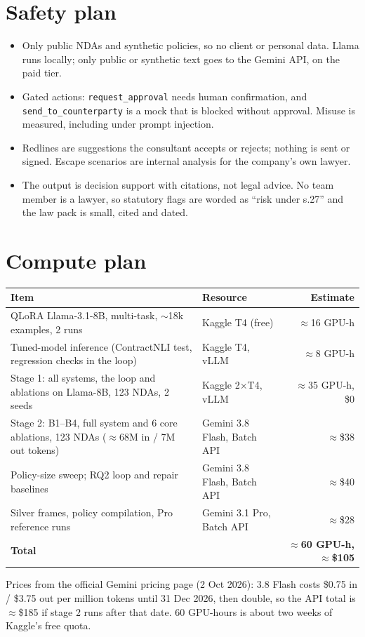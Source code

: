 \documentclass[11pt,a4paper]{article}
\begin{document}
\section{Safety plan}
\begin{itemize}
\item Only public NDAs and synthetic policies, so no client or personal data. Llama runs locally; only public or synthetic text goes to the Gemini API, on the paid tier.
\item Gated actions: \texttt{request\_approval} needs human confirmation, and \texttt{send\_to\_counterparty} is a mock that is blocked without approval. Misuse is measured, including under prompt injection.
\item Redlines are suggestions the consultant accepts or rejects; nothing is sent or signed. Escape scenarios are internal analysis for the company's own lawyer.
\item The output is decision support with citations, not legal advice. No team member is a lawyer, so statutory flags are worded as ``risk under s.27'' and the law pack is small, cited and dated.
\end{itemize}

\section{Compute plan}
\begin{table}[H]\small
\begin{tabularx}{\textwidth}{@{}LXr@{}}
\toprule
\textbf{Item} & \textbf{Resource} & \textbf{Estimate} \\
\midrule
QLoRA Llama-3.1-8B, multi-task, $\sim$18k examples, 2 runs & Kaggle T4 (free) & $\approx$16 GPU-h \\
Tuned-model inference (ContractNLI test, regression checks in the loop) & Kaggle T4, vLLM & $\approx$8 GPU-h \\
Stage 1: all systems, the loop and ablations on Llama-8B, 123 NDAs, 2 seeds & Kaggle 2$\times$T4, vLLM & $\approx$35 GPU-h, \$0 \\
Stage 2: B1--B4, full system and 6 core ablations, 123 NDAs ($\approx$68M in / 7M out tokens) & Gemini 3.8 Flash, Batch API & $\approx$\$38 \\
Policy-size sweep; RQ2 loop and repair baselines & Gemini 3.8 Flash, Batch API & $\approx$\$40 \\
Silver frames, policy compilation, Pro reference runs & Gemini 3.1 Pro, Batch API & $\approx$\$28 \\
\midrule
\textbf{Total} & & \textbf{$\approx$60 GPU-h, $\approx$\$105} \\
\bottomrule
\end{tabularx}
\end{table}
\vspace{-4pt}
{\small Prices from the official Gemini pricing page (2 Oct 2026): 3.8 Flash costs \$0.75 in / \$3.75 out per million tokens until 31 Dec 2026, then double, so the API total is $\approx$\$185 if stage 2 runs after that date. 60 GPU-hours is about two weeks of Kaggle's free quota.}
\end{document}
